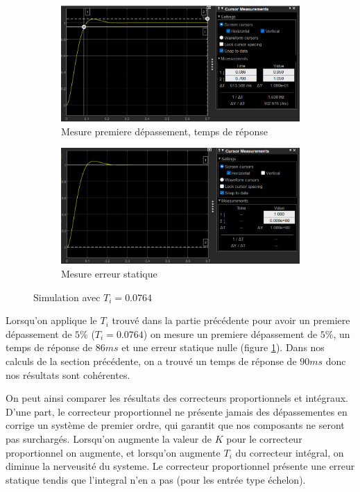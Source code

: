 \documentclass[12pt, a4paper]{report}
\begin{document}
\begin{figure}[H]
    \begin{subfigure}[h!]{0.4\linewidth}
        \includegraphics[width=\linewidth]{sim1123tr5prc1erdep.png}
        \caption{Mesure premiere dépassement, temps de réponse}
    \end{subfigure}
    \hfill
    \begin{subfigure}[h!]{0.4\linewidth}
        \includegraphics[width=\linewidth]{sim1123erreur.png}
        \caption{Mesure erreur statique}
    \end{subfigure}
    \caption{Simulation avec $T_i = 0.0764$}
    \label{fig:tipour5prc}
\end{figure}

Lorsqu'on applique le $T_i$ trouvé dans la partie précédente pour avoir un premiere dépassement de $5\%$
($T_i = 0.0764$) on mesure un premiere dépassement de $5\%$, un temps de réponse de $86ms$ et une erreur statique nulle (figure \ref{fig:tipour5prc}).
Dans nos calculs de la section précédente, on a trouvé un temps de réponse de $90ms$ donc nos résultats sont cohérentes.

On peut ainsi comparer les résultats des correcteurs proportionnels et intégraux. D'une part, le correcteur
proportionnel ne présente jamais des dépassementes en corrige un système de premier ordre, qui garantit 
que nos composants ne seront pas surchargés. Lorsqu'on augmente la valeur de $K$ pour le correcteur proportionnel 
on augmente, et lorsqu'on augmente $T_i$ du correcteur intégral, on diminue la nerveusité du systeme. Le correcteur proportionnel présente
une erreur statique tendis que l'integral n'en a pas (pour les entrée type échelon).
\end{document}
